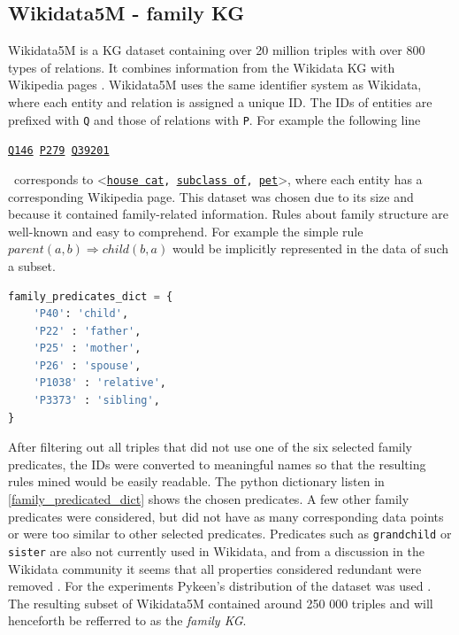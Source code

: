 \subsection{Wikidata5M - family KG}
Wikidata5M is a KG dataset containing over 20 million triples with over 800 types of relations. It combines information from the Wikidata KG with Wikipedia pages \cite{wang2019kepler}. Wikidata5M uses the same identifier system as Wikidata, where each entity and relation is assigned a unique ID. The IDs of entities are prefixed with \texttt{Q} and those of relations with \texttt{P}. For example the following line \\
\centerline{\texttt{\href{https://www.wikidata.org/wiki/Q146}{Q146} \quad \href{https://www.wikidata.org/wiki/Property:P279}{P279} \quad  \href{https://www.wikidata.org/wiki/Q39201}{Q39201}}} \
corresponds to \textless\texttt{\href{https://www.wikidata.org/wiki/Q146}{house cat}, \href{https://www.wikidata.org/wiki/Property:P279}{subclass of}, \href{https://www.wikidata.org/wiki/Q39201}{pet}}\textgreater, where each entity has a corresponding Wikipedia page.
This dataset was chosen due to its size and because it contained family-related information. Rules about family structure are well-known and easy to comprehend. For example the simple rule $parent(a, b) \Rightarrow  child(b, a)$ would be implicitly represented in the data of such a subset.
\begin{lstlisting}[language=Python, caption={Python dictionary converting family predicate IDs to their names},captionpos=t, label={family_predicated_dict}]
family_predicates_dict = {
    'P40': 'child', 
    'P22' : 'father', 
    'P25' : 'mother',
    'P26' : 'spouse', 
    'P1038' : 'relative', 
    'P3373' : 'sibling', 
}
\end{lstlisting}

After filtering out all triples that did not use one of the six selected family predicates, the IDs were converted to meaningful names so that the resulting rules mined would be easily readable. The python dictionary listen in \ref{family_predicated_dict} shows the chosen predicates. A few other family predicates were considered, but did not have as many corresponding data points or were too similar to other selected predicates. Predicates such as \texttt{grandchild} or \texttt{sister} are also not currently used in Wikidata, and from a discussion in the Wikidata community it seems that all properties considered redundant were removed \cite{kinship_discussion}. For the experiments Pykeen's distribution of the dataset was used \cite{ali2021pykeen}. The resulting subset of Wikidata5M contained around 250 000 triples and will henceforth be refferred to as the \textit{family KG}. 

